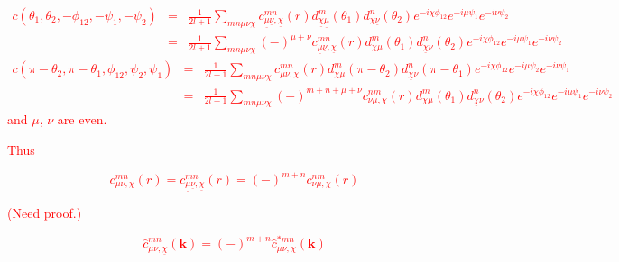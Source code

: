 \textcolor{red}{
\begin{eqnarray*}
c(\theta_{1},\theta_{2},-\phi_{12},-\psi_{1},-\psi_{2}) & = & \frac{1}{2l+1}\sum_{mn\mu\nu\chi}c_{\underline{\mu}\underline{\nu},\underline{\chi}}^{mn}(r)d_{\underline{\chi}\underline{\mu}}^{m}(\theta_{1})d_{\chi\underline{\nu}}^{n}(\theta_{2})e^{-i\chi\phi_{12}}e^{-i\mu\psi_{1}}e^{-i\nu\psi_{2}}\\
 & = & \frac{1}{2l+1}\sum_{mn\mu\nu\chi}\left(-\right)^{\mu+\nu}c_{\underline{\mu}\underline{\nu},\underline{\chi}}^{mn}(r)d_{\chi\mu}^{m}(\theta_{1})d_{\underline{\chi}\nu}^{n}(\theta_{2})e^{-i\chi\phi_{12}}e^{-i\mu\psi_{1}}e^{-i\nu\psi_{2}}
\end{eqnarray*}
\begin{eqnarray*}
c(\pi-\theta_{2},\pi-\theta_{1},\phi_{12},\psi_{2},\psi_{1}) & = & \frac{1}{2l+1}\sum_{mn\mu\nu\chi}c_{\mu\nu,\chi}^{mn}(r)d_{\chi\mu}^{m}(\pi-\theta_{2})d_{\underline{\chi}\nu}^{n}(\pi-\theta_{1})e^{-i\chi\phi_{12}}e^{-i\mu\psi_{2}}e^{-i\nu\psi_{1}}\\
 & = & \frac{1}{2l+1}\sum_{mn\mu\nu\chi}\left(-\right)^{m+n+\mu+\nu}c_{\nu\mu,\chi}^{nm}(r)d_{\chi\mu}^{m}(\theta_{1})d_{\underline{\chi}\nu}^{n}(\theta_{2})e^{-i\chi\phi_{12}}e^{-i\mu\psi_{1}}e^{-i\nu\psi_{2}}
\end{eqnarray*}
and $\mu$, $\nu$ are even.}

\textcolor{red}{Thus}

\textcolor{red}{
\[
c_{\mu\nu,\chi}^{mn}(r)=c_{\underline{\mu}\underline{\nu},\underline{\chi}}^{mn}(r)=\left(-\right)^{m+n}c_{\nu\mu,\chi}^{nm}(r)
\]
}

\textcolor{red}{(Need proof.)}

\textcolor{red}{
\[
\hat{c}_{\mu\nu,\underline{\chi}}^{mn}(\mathbf{k})=\left(-\right)^{m+n}\hat{c}_{\mu\nu,\chi}^{*mn}(\mathbf{k})
\]
}

